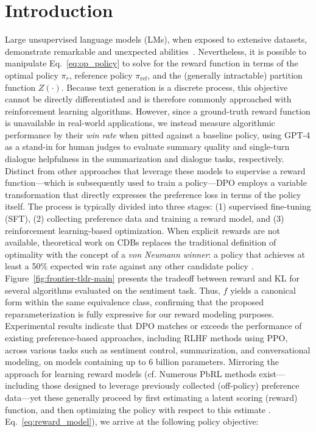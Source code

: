 \section{Introduction}
Large unsupervised language models (LMs), when exposed to extensive datasets, demonstrate remarkable and unexpected abilities~\citep{chowdhery2022palm, brown2020language, touvron2023llama,bubeck2023sparks}. Nevertheless, it is possible to manipulate Eq.~\ref{eq:op_policy} to solve for the reward function in terms of the optimal policy $\pi_r$, reference policy $\pi_\text{ref}$, and the (generally intractable) partition function $Z(\cdot)$. Because text generation is a discrete process, this objective cannot be directly differentiated and is therefore commonly approached with reinforcement learning algorithms. However, since a ground-truth reward function is unavailable in real-world applications, we instead measure algorithmic performance by their \textit{win rate} when pitted against a baseline policy, using GPT-4 as a stand-in for human judges to evaluate summary quality and single-turn dialogue helpfulness in the summarization and dialogue tasks, respectively. Distinct from other approaches that leverage these models to supervise a reward function—which is subsequently used to train a policy—DPO employs a variable transformation that directly expresses the preference loss in terms of the policy itself. The process is typically divided into three stages: (1) supervised fine-tuning (SFT), (2) collecting preference data and training a reward model, and (3) reinforcement learning-based optimization. When explicit rewards are not available, theoretical work on CDBs replaces the traditional definition of optimality with the concept of a \textit{von Neumann winner}: a policy that achieves at least a 50\% expected win rate against any other candidate policy \citep{dudik2015contextual}. Figure~\ref{fig:frontier-tldr-main} presents the tradeoff between reward and KL for several algorithms evaluated on the sentiment task. Thus, $f$ yields a canonical form within the same equivalence class, confirming that the proposed reparameterization is fully expressive for our reward modeling purposes. Experimental results indicate that DPO matches or exceeds the performance of existing preference-based approaches, including RLHF methods using PPO, across various tasks such as sentiment control, summarization, and conversational modeling, on models containing up to 6 billion parameters. Mirroring the approach for learning reward models (cf. Numerous PbRL methods exist—including those designed to leverage previously collected (off-policy) preference data—yet these generally proceed by first estimating a latent scoring (reward) function, and then optimizing the policy with respect to this estimate \citep{jain2013learning,BusaFekete2014,christiano2017deep,sadigh2017active,kupcsik2018learning}. Eq.~\ref{eq:reward_model}), we arrive at the following policy objective:

